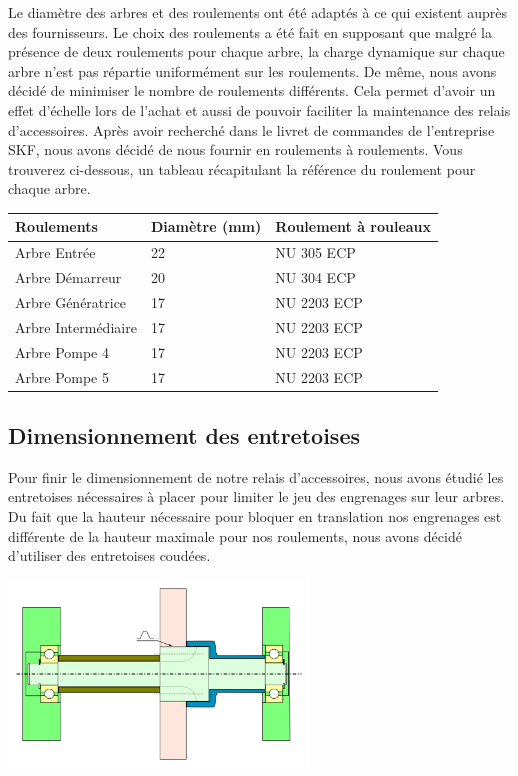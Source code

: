 \documentclass{config}
\begin{document}
\begin{spacing}{1.2}
Le diamètre des arbres et des roulements ont été adaptés à ce qui existent auprès des fournisseurs. Le choix des roulements a été fait en supposant que malgré la présence de deux roulements pour chaque arbre, la charge dynamique sur chaque arbre n'est pas répartie uniformément sur les roulements. De même, nous avons décidé de minimiser le nombre de roulements différents. Cela permet d'avoir un effet d'échelle lors de l'achat et aussi de pouvoir faciliter la maintenance des relais d'accessoires.
Après avoir recherché dans le livret de commandes de l'entreprise SKF, nous avons décidé de nous fournir en roulements à roulements. Vous trouverez ci-dessous, un tableau récapitulant la référence du roulement pour chaque arbre.

\begin{table}[]
\centering
{%
\begin{tabular}{|l|l|l|}
\hline
Roulements & Diamètre (mm) & Roulement à rouleaux \\ \hline
Arbre Entrée & 22 & NU 305 ECP \\ \hline
Arbre Démarreur & 20 & NU 304 ECP \\ \hline
Arbre Génératrice & 17 & NU 2203 ECP \\ \hline
Arbre Intermédiaire & 17 & NU 2203 ECP \\ \hline
Arbre Pompe 4 & 17 & NU 2203 ECP \\ \hline
Arbre Pompe 5 & 17 & NU 2203 ECP \\ \hline
\end{tabular}%
}
\end{table}



\newpage
\subsection{Dimensionnement des entretoises}

Pour finir le dimensionnement de notre relais d'accessoires, nous avons étudié les entretoises nécessaires à placer pour limiter le jeu des engrenages sur leur arbres. Du fait que la hauteur nécessaire pour bloquer en translation nos engrenages est différente de la hauteur maximale pour nos roulements, nous avons décidé d'utiliser des entretoises coudées.

\begin{center}
\includegraphics[width=0.6\textwidth]{Solution_cannelures.png}
\end{center}


\end{spacing}
\end{document}
